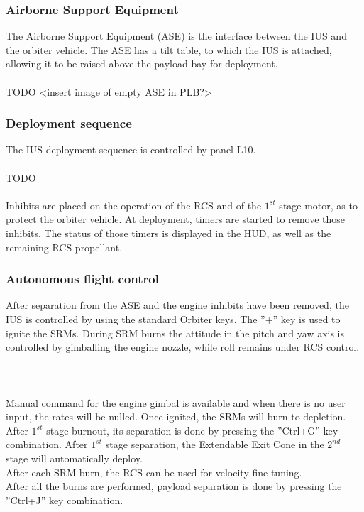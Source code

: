 \documentclass[Space_Shuttle_Ultra_Manual.tex]{subfiles}
\begin{document}
\begin{multicols*}{2}
\subsubsection{Airborne Support Equipment}
The Airborne Support Equipment (ASE) is the interface between the IUS and the orbiter vehicle. The ASE has a tilt table, to which the IUS is attached, allowing it to be raised above the payload bay for deployment.
\\
\\
TODO <insert image of empty ASE in PLB?>

\subsubsection{Deployment sequence}
The IUS deployment sequence is controlled by panel L10.
\\
\\
TODO
\\
\\
Inhibits are placed on the operation of the RCS and of the $1^{st}$ stage motor, as to protect the orbiter vehicle. At deployment, timers are started to remove those inhibits. The status of those timers is displayed in the HUD, as well as the remaining RCS propellant.

\subsubsection{Autonomous flight control}
After separation from the ASE and the engine inhibits have been removed, the IUS is controlled by using the standard Orbiter keys. The ''+'' key is used to ignite the SRMs. During SRM burns the attitude in the pitch and yaw axis is controlled by gimballing the engine nozzle, while roll remains under RCS control.
\\
\\
\\
\\
Manual command for the engine gimbal is available and when there is no user input, the rates will be nulled. Once ignited, the SRMs will burn to depletion.\\
After $1^{st}$ stage burnout, its separation is done by pressing the ''Ctrl+G'' key combination. After $1^{st}$ stage separation, the Extendable Exit Cone in the $2^{nd}$ stage will automatically deploy.\\
After each SRM burn, the RCS can be used for velocity fine tuning.\\
After all the burns are performed, payload separation is done by pressing the ''Ctrl+J'' key combination.


\end{multicols*}
\end{document}
